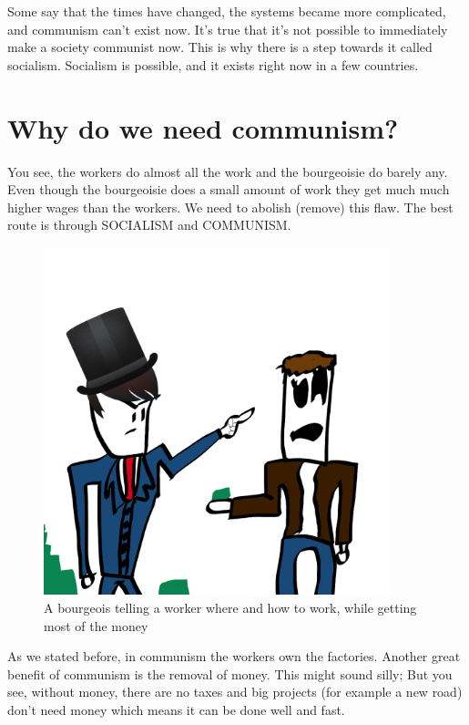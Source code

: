 \documentclass[a4paper]{book}%
\begin{document}
Some say that the times have changed, the systems became more complicated, and communism can't exist now. It's true that it's not possible to immediately make a society communist now. This is why there is a step towards it called socialism. Socialism is possible, and it exists right now in a few countries.

\chapter{Why do we need communism?}

You see, the workers do almost all the work and the bourgeoisie do barely any. Even though the bourgeoisie does a small amount of work they get much much higher wages than the workers. We need to abolish (remove) this flaw. The best route is through SOCIALISM and COMMUNISM.

\begin{figure}[tbhp]
\centering
\includegraphics[width=0.9\textwidth]{2-1.png}
\caption{A bourgeois telling a worker where and how to work, while getting most of the money}
\end{figure}
  
  As we stated before, in communism the workers own the factories. Another great benefit of communism is the removal of money. This might sound silly; But you see, without money, there are no taxes and big projects (for example a new road) don't need money which means it can be done well and fast.
\end{document}
